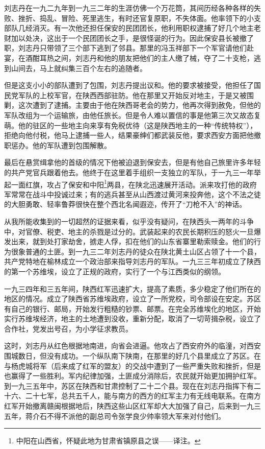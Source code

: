 \documentclass[10pt]{book}
\begin{document}
刘志丹在一九二九年到一九三二年的生涯仿佛一个万花筒，其间历经各种各样的失败、挫折、捣乱、冒险、死里逃生，有时还官复原职，不失体面。他率领下的小支部队几经消灭。有一次他还担任保安的民团团长，他利用职权逮捕了好几个地主老财加以处决，这出于一个民团团长之手，是很怪诞的行为。因此保安县长被撤了职，刘志丹只带领了三个部下逃到了邻县。那里的冯玉祥部下一个军官请他们赴宴，在酒酣耳热之间，刘志丹和他的朋友把他们的主人缴了械，夺了二十支枪，逃到山间去，马上就纠集三百个左右的追随者。

但是这支小小的部队遭到了包围，刘志丹提出议和。他的要求被接受，他担任了国民党军队的上校军官，在陕西西部驻防。他在那里又开始反对地主，于是又被围剿，这次遭到了逮捕。主要由于他在陕西哥老会的势力，他再次得到赦免，但他的军队改组为一个运输旅，由他任旅长。但是令人难以置信的事是他第三次又故态复萌。他的驻区的一些地主向来享有免税优待（这是陕西地主的一种“传统特权”），拒绝向他付税，他马上逮捕一些人，结果豪绅们都武装反他，要求西安方面把他撤职惩办。他的军队遭到包围解散。

最后在悬赏缉拿他的首级的情况下他被迫退到保安去，但是有他自己旅里许多年轻的共产党官兵跟着他去。他终于在这里着手组织一支独立的军队，于一九三一年举起一面红旗，攻占了保安和中阳\footnote{中阳在山西省，怀疑此地为甘肃省镇原县之误——译注。}两县，在陕北迅速展开活动。派来攻打他的政府军常常在战斗中投诚过来；有的逃兵甚至从山西渡过黄河来投奔他，这个不法之徒的大胆勇敢、轻率鲁莽很快在整个西北名闻遐迩，传开了“刀枪不入”的神话。

从我所能收集到的一切超然的证据来看，似乎没有疑问，在陕西头一两年的斗争中，对官僚、税吏、地主的杀戮是过分的。武装起来的农民长期积压的怒火一旦爆发出来，就到处打家劫舍，掳走人俘，扣在他们的山东省寨里勒索赎金。他们的行为很象普通的土匪。到一九三二年刘志丹的徒众在陕北黄土山区占领了十一个县，共产党特地在榆林成立一个政治部来指导刘志丹的军队。一九三三年初成立了陕西的第一个苏维埃，设立了正规的政府，实行了一个与江西类似的纲领。

一九三四年和三五年间，陕西红军迅速扩大，提高了素质，多少稳定了他们所在的地区的情况。成立了陕西省苏维埃政府，设立了一所党校，司令部设在安定。苏区有自己的银行、邮局，开始发行粗糙的钞票、邮票。在完全苏维埃化的地区，开始实行苏维埃经济，地主的土地遭到没收，重新分配，取消了一切苛揖杂税，设立了合作社，党发出号召，为小学征求教员。

这时，刘志丹从红色根据地南进，向省会进逼。他攻占了西安府外的临潼，对西安围城数日，但没有成功。一个纵队南下陕南，在那里的好几个县里成立了苏区。在与杨虎城将军（后来成了红军的盟友）的交战中遭到了一些严重失败和挫折，但是也赢得了一些胜利。军内纪律加强，土匪成分消除后，农民就开始更加拥护红军。到一九三五年中，苏区在陕西和甘肃控制了二十二个县。现在在刘志丹指挥下有二十六、二十七军，总共五千人，能与南方的西方的红军主力有无线电联系。在南方红军开始撤离赣闽根据地后，陕西这些山区红军却大大加强了自己，后来到一九三五年，蒋介石不得不派他的副总司令张学良少帅率领大军来对付他们。
\end{document}
